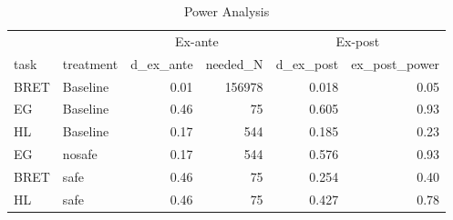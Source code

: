 \begin{table}

\caption{Power Analysis}
\centering
\begin{tabular}[t]{llrrrr}
\toprule
\multicolumn{1}{c}{} & \multicolumn{1}{c}{} & \multicolumn{2}{c}{Ex-ante} & \multicolumn{2}{c}{Ex-post} \\
\cmidrule(l{3pt}r{3pt}){3-4} \cmidrule(l{3pt}r{3pt}){5-6}
task & treatment & d\_ex\_ante & needed\_N & d\_ex\_post & ex\_post\_power\\
\midrule
BRET & Baseline & 0.01 & 156978 & 0.018 & 0.05\\
EG & Baseline & 0.46 & 75 & 0.605 & 0.93\\
HL & Baseline & 0.17 & 544 & 0.185 & 0.23\\
EG & nosafe & 0.17 & 544 & 0.576 & 0.93\\
BRET & safe & 0.46 & 75 & 0.254 & 0.40\\
\addlinespace
HL & safe & 0.46 & 75 & 0.427 & 0.78\\
\bottomrule
\end{tabular}
\end{table}